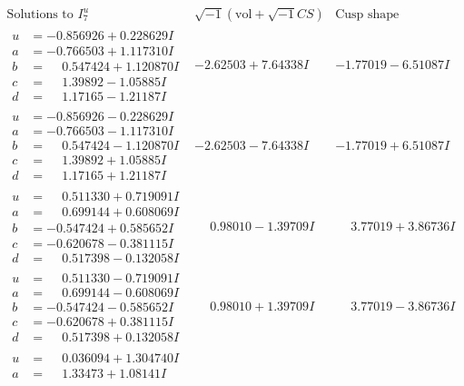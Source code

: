\documentclass[1p]{elsarticle_modified}
\theoremstyle{definition}
\newcommand{\I}{\sqrt{-1}}
\begin{document}
$$\begin{array}{c|c|c}  
\text{Solutions to }I^u_{7}& \I (\text{vol} + \sqrt{-1}CS) & \text{Cusp shape}\\
 \hline 
\begin{aligned}
u &= -0.856926 + 0.228629 I \\
a &= -0.766503 + 1.117310 I \\
b &= \phantom{-}0.547424 + 1.120870 I \\
c &= \phantom{-}1.39892 - 1.05885 I \\
d &= \phantom{-}1.17165 - 1.21187 I\end{aligned}
 & -2.62503 + 7.64338 I & -1.77019 - 6.51087 I \\ \hline\begin{aligned}
u &= -0.856926 - 0.228629 I \\
a &= -0.766503 - 1.117310 I \\
b &= \phantom{-}0.547424 - 1.120870 I \\
c &= \phantom{-}1.39892 + 1.05885 I \\
d &= \phantom{-}1.17165 + 1.21187 I\end{aligned}
 & -2.62503 - 7.64338 I & -1.77019 + 6.51087 I \\ \hline\begin{aligned}
u &= \phantom{-}0.511330 + 0.719091 I \\
a &= \phantom{-}0.699144 + 0.608069 I \\
b &= -0.547424 + 0.585652 I \\
c &= -0.620678 - 0.381115 I \\
d &= \phantom{-}0.517398 - 0.132058 I\end{aligned}
 & \phantom{-}0.98010 - 1.39709 I & \phantom{-}3.77019 + 3.86736 I \\ \hline\begin{aligned}
u &= \phantom{-}0.511330 - 0.719091 I \\
a &= \phantom{-}0.699144 - 0.608069 I \\
b &= -0.547424 - 0.585652 I \\
c &= -0.620678 + 0.381115 I \\
d &= \phantom{-}0.517398 + 0.132058 I\end{aligned}
 & \phantom{-}0.98010 + 1.39709 I & \phantom{-}3.77019 - 3.86736 I \\ \hline\begin{aligned}
u &= \phantom{-}0.036094 + 1.304740 I \\
a &= \phantom{-}1.33473 + 1.08141 I \\

\end{aligned}
\end{array}$$
\end{document}
